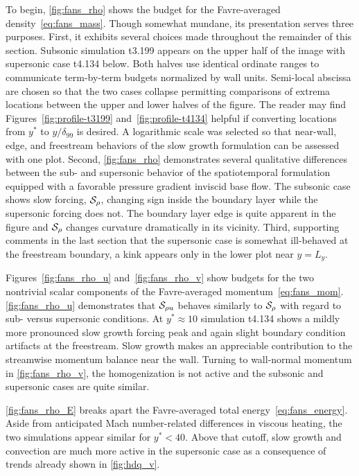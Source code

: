 To begin, \autoref{fig:fans_rho} shows the budget for the Favre-averaged density~\eqref{eq:fans_mass}.  Though somewhat mundane, its presentation serves
three purposes.  First, it exhibits several choices made throughout the
remainder of this section.  Subsonic simulation t3.199 appears on the upper half
of the image with supersonic case t4.134 below.  Both halves use identical
ordinate ranges to communicate term-by-term budgets normalized by wall units.
Semi-local abscissa are chosen so that the two cases collapse permitting
comparisons of extrema locations between the upper and lower halves of the
figure.  The reader may find Figures~\ref{fig:profile-t3199}
and~\ref{fig:profile-t4134} helpful if converting locations from $y^\ast$ to
$y/\delta_{99}$ is desired.  A
logarithmic scale was selected so that near-wall, edge, and freestream behaviors of
the slow growth formulation can be assessed with one plot.  Second, \autoref{fig:fans_rho}
demonstrates several qualitative differences between the sub- and supersonic
behavior of the spatiotemporal formulation equipped with a favorable pressure
gradient inviscid base flow.  The subsonic case shows slow forcing, $\mathcal{S}_\rho$,
changing sign inside the boundary layer while the supersonic forcing does not.
The boundary layer edge is quite apparent in the figure and $\mathcal{S}_\rho$ changes
curvature dramatically in its vicinity.  Third, supporting comments in the last
section that the supersonic case is somewhat ill-behaved at the freestream
boundary, a kink appears only in the lower plot near $y=L_y$.

Figures~\ref{fig:fans_rho_u} and~\ref{fig:fans_rho_v} show budgets for
the two nontrivial scalar components of the Favre-averaged momentum~\eqref{eq:fans_mom}.  \autoref{fig:fans_rho_u}
demonstrates that $\mathcal{S}_{\rho u}$ behaves similarly to $\mathcal{S}_{\rho}$ with
regard to sub- versus supersonic conditions.  At $y^{\ast}\approx{}10$
simulation t4.134 shows a mildly more pronounced slow growth forcing peak and
again slight boundary condition artifacts at the freestream.  Slow growth makes
an appreciable contribution to the streamwise momentum balance
near the wall.  Turning to wall-normal momentum in
\autoref{fig:fans_rho_v}, the homogenization is not active and the subsonic and
supersonic cases are quite similar.

\autoref{fig:fans_rho_E} breaks apart the Favre-averaged total energy~\eqref{eq:fans_energy}.
Aside from anticipated Mach number-related
differences in viscous heating, the two simulations appear similar for
$y^\ast<40$.  Above that cutoff, slow growth and convection are much more active
in the supersonic case as a consequence of trends already shown in
\autoref{fig:hdq_v}.

